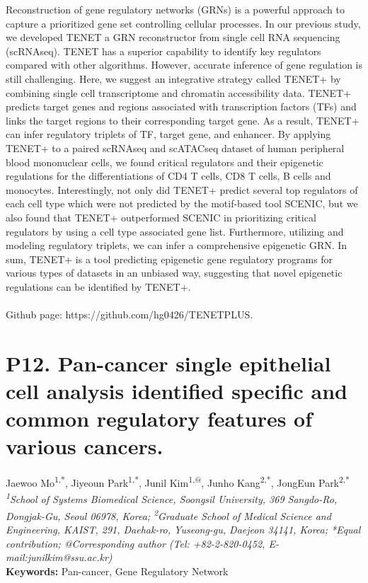 \noindent
Reconstruction of gene regulatory networks (GRNs) is a powerful approach to capture a prioritized gene set controlling cellular processes. In our previous study, we developed TENET a GRN reconstructor from single cell RNA sequencing (scRNAseq). TENET has a superior capability to identify key regulators compared with other algorithms. However, accurate inference of gene regulation is still challenging. Here, we suggest an integrative strategy called TENET+ by combining single cell transcriptome and chromatin accessibility data. TENET+ predicts target genes and regions associated with transcription factors (TFs) and links the target regions to their corresponding target gene. As a result, TENET+ can infer regulatory triplets of TF, target gene, and enhancer. By applying TENET+ to a paired scRNAseq and scATACseq dataset of human peripheral blood mononuclear cells, we found critical regulators and their epigenetic regulations for the differentiations of CD4 T cells, CD8 T cells, B cells and monocytes. Interestingly, not only did TENET+ predict several top regulators of each cell type which were not predicted by the motif-based tool SCENIC, but we also found that TENET+ outperformed SCENIC in prioritizing critical regulators by using a cell type associated gene list. Furthermore, utilizing and modeling regulatory triplets, we can infer a comprehensive epigenetic GRN. In sum, TENET+ is a tool predicting epigenetic gene regulatory programs for various types of datasets in an unbiased way, suggesting that novel epigenetic regulations can be identified by TENET+.
\\
\\
\noindent
Github page: https://github.com/hg0426/TENETPLUS.
\newpage

\section*{P12. Pan-cancer single epithelial cell analysis identified specific and common regulatory features of various cancers.}

\begin{center}
Jaewoo Mo\textsuperscript{1,*}, Jiyeoun Park\textsuperscript{1,*}, Junil Kim\textsuperscript{1,@}, Junho Kang\textsuperscript{2,*}, JongEun Park\textsuperscript{2,*} \\
\vspace{0.2cm}
\textit{\textsuperscript{1}School of Systems Biomedical Science, Soongsil University, 369 Sangdo-Ro, Dongjak-Gu, Seoul 06978, Korea; \textsuperscript{2}Graduate School of Medical Science and Engineering, KAIST, 291, Daehak-ro, Yuseong-gu, Daejeon 34141, Korea; *Equal contribution; @Corresponding author (Tel: +82-2-820-0452, E-mail:junilkim@ssu.ac.kr)} \\
\vspace{0.2cm}
\textbf{Keywords:} Pan-cancer, Gene Regulatory Network
\end{center}

